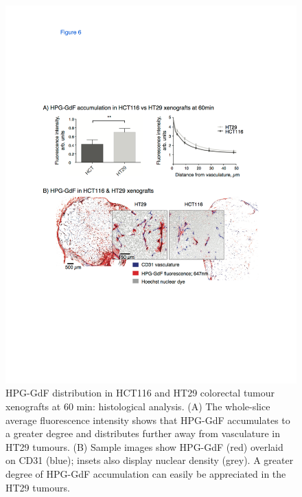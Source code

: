 \begin{figure}[htbp]
 \begin{center}
 \includegraphics[width=\textwidth]{hpg/hpg-paper1-images/hpg_fig6-accumulation.pdf}
 \caption{HPG-GdF distribution in HCT116 and HT29 colorectal tumour xenografts at 60 min: histological analysis.
 (A) The whole-slice average fluorescence intensity shows that HPG-GdF accumulates to a greater degree and distributes further away from vasculature in HT29 tumours.
 (B) Sample images show HPG-GdF (red) overlaid on CD31 (blue); insets also display nuclear density (grey).
 A greater degree of HPG-GdF accumulation can easily be appreciated in the HT29 tumours.}
 \label{hpgpaper1:fig6}
 \end{center}
\end{figure}

